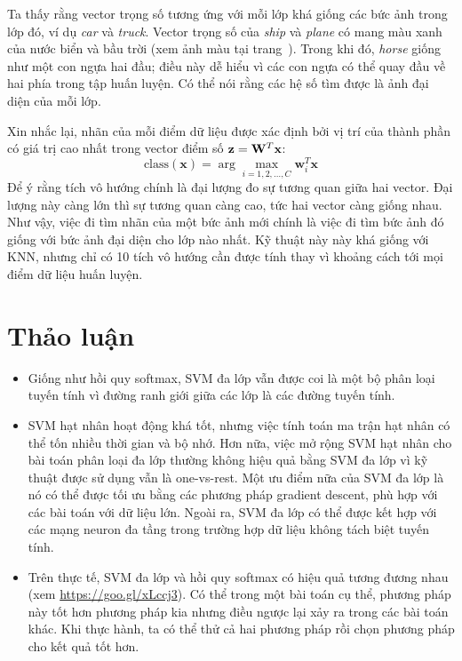 Ta thấy rằng vector trọng số tương ứng với mỗi lớp khá giống các bức
ảnh trong lớp đó, ví dụ \textit{car} và \textit{truck}. Vector trọng số của
\textit{ship} và \textit{plane} có mang màu xanh của nước biển và bầu trời (xem
ảnh màu tại trang~\pageref{fig:22_9_c}). Trong khi đó, \textit{horse} giống như
một con ngựa hai đầu; điều này dễ hiểu vì các con ngựa có
thể quay đầu về hai phía trong tập huấn luyện. Có thể nói rằng các hệ số tìm được là ảnh đại diện của mỗi lớp.

Xin nhắc lại, nhãn của mỗi điểm dữ liệu được xác định bởi vị trí của thành phần có giá trị cao nhất trong vector điểm số $\mathbf{z} = \mathbf{W}^T\mathbf{x}$:
\begin{equation*}
\text{class}(\mathbf{x}) = \arg\max_{i = 1, 2, \dots, C} \mathbf{w}_i^T\mathbf{x}
\end{equation*}
Để ý rằng tích vô hướng chính là đại lượng đo sự tương quan giữa hai vector. Đại
lượng này càng lớn thì sự tương quan càng cao, tức hai vector càng giống nhau.
Như vậy, việc đi tìm nhãn của một bức ảnh mới chính là việc đi tìm bức ảnh đó
giống với bức ảnh {đại diện} cho lớp nào nhất. Kỹ thuật này này khá giống
với KNN, nhưng chỉ có 10 tích vô hướng cần được tính thay vì khoảng cách tới mọi điểm dữ liệu huấn luyện.


\section{Thảo luận }
\begin{itemize}
\item Giống như hồi quy softmax, SVM đa lớp vẫn được coi là một bộ
phân loại tuyến tính vì đường ranh giới giữa các lớp là các đường tuyến tính.

\item SVM hạt nhân hoạt động khá tốt, nhưng việc tính toán ma trận hạt nhân có thể tốn nhiều thời gian và bộ nhớ. Hơn nữa, việc mở rộng SVM hạt nhân cho bài toán phân loại đa lớp thường không hiệu quả bằng SVM đa lớp
vì kỹ thuật được sử dụng vẫn là one-vs-rest. Một ưu điểm nữa của     SVM đa lớp là nó có thể được tối ưu bằng các phương pháp gradient descent, phù hợp
với các bài toán với dữ liệu lớn. Ngoài ra, SVM đa lớp có thể được kết hợp với các mạng neuron đa tầng trong trường hợp dữ liệu không tách biệt tuyến tính.


\item  Trên thực tế, SVM đa lớp và hồi quy softmax có hiệu quả tương
đương nhau (xem \url{https://goo.gl/xLccj3}). Có thể trong một bài toán cụ
thể, phương pháp này tốt hơn phương pháp kia nhưng điều ngược lại xảy ra
trong các bài toán khác. Khi thực hành, ta có thể thử cả hai
phương pháp rồi chọn phương pháp cho kết quả tốt hơn.
\end{itemize}





